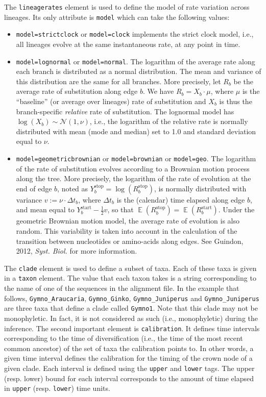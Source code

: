 \documentclass[a4paper,12pt]{article}
\newcommand{\x}[1]{\texttt{#1}}
\DeclareMathOperator*{\Ex}{\mathbb{E}}
\begin{document}
The \x{lineagerates} element is used to define the model of rate
variation across lineages. Its only attribute is \x{model} which can take the following values:
\begin{itemize}
\item \x{model=strictclock} or \x{model=clock}  implements the strict clock model, i.e., all lineages
  evolve at the same instantaneous rate, at any point in time.
\item \x{model=lognormal} or \x{model=normal}. The logarithm of the average rate along each branch is distributed as a
  normal distribution. The mean and variance of this distribution are the same for all branches. More
  precisely, let $R_b$ be the average rate of substitution along edge $b$. We have $R_b=X_b\cdot
  \mu$, where $\mu$ is the ``baseline'' (or average over lineages) rate of substitution and $X_b$ is
  thus the branch-specific {\em relative} rate of substitution. The lognormal model has $\log(X_b)
  \sim \mathcal{N}(1,\nu)$, i.e., the logarithm of the relative rate is normally distributed with
  mean (mode and median) set to 1.0 and standard deviation equal to $\nu$.
\item \x{model=geometricbrownian} or \x{model=brownian} or \x{model=geo}. The logarithm of the rate
  of substitution evolves according to a Brownian motion process along the tree. More precisely, the
  logarithm of the rate of evolution at the end of edge $b$, noted as $Y_b^{\text{stop}}=\log(R_b^{\text{stop}})$, is
  normally distributed with variance $v := \nu \cdot \Delta t_b$, where $\Delta t_b$ is the (calendar) time elapsed
  along edge $b$, and mean equal to $Y_b^{\text{start}}-\frac{1}{2} v$, so that $\Ex(R_b^{\text{stop}})=\Ex(R_b^{\text{start}})$.
  Under the geometric Brownian motion model, the average rate of evolution is also random. This
  variability is taken into account in the calculation of the transition between nucleotides or
  amino-acids along edges. See Guindon, 2012, {\em Syst. Biol.} for more information.
\end{itemize}

The \x{clade} element is used to define a subset of taxa. Each of these taxa is
given in a \x{taxon} element. The  value that each taxon takes is a string corresponding to the
name of one of the sequences in the alignment file. In the example that follows, \x{Gymno\_Araucaria},
\x{Gymno\_Ginko}, \x{Gymno\_Juniperus} and
\x{Gymno\_Juniperus} are three taxa that define a clade called \x{Gymno1}. Note that  this clade may
not be monophyletic. In fact, it is not considered as such (i.e., monophyletic) during the
inference. The second important element is \x{calibration}. It defines time intervals corresponding
to the time of diversification (i.e., the time of the most recent common ancestor) of the set of
taxa the calibration points to. In other words, a given time
interval defines the calibration for the timing of the crown node of a given clade. Each interval is defined using 
the \x{upper} and \x{lower} tags. The upper (resp. lower) bound for each interval corresponds to the amount of time elapsed
in \x{upper} (resp. \x{lower}) time units.
\end{document}
